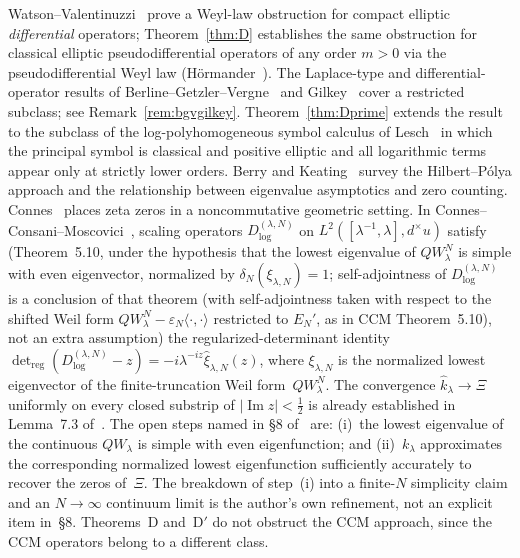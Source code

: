 \documentclass[12pt]{amsart}
\begin{document}
Watson--Valentinuzzi~\cite{Watson2026} prove a Weyl-law obstruction
for compact elliptic \emph{differential} operators; Theorem~\ref{thm:D}
establishes the same obstruction for classical elliptic
pseudodifferential operators of any order $m>0$ via the
pseudodifferential Weyl law (H\"ormander~\cite{Hormander1968}).
The Laplace-type and differential-operator results of
Berline--Getzler--Vergne~\cite{BGV2004} and Gilkey~\cite{Gilkey1995}
cover a restricted subclass; see Remark~\ref{rem:bgvgilkey}.
Theorem~\ref{thm:Dprime} extends the result to the subclass of the
log-polyhomogeneous symbol calculus of Lesch~\cite{Lesch1999} in
which the principal symbol is classical and positive elliptic and all
logarithmic terms appear only at strictly lower orders.
Berry and Keating~\cite{BerryKeating1999} survey the Hilbert--P\'olya
approach and the relationship between eigenvalue asymptotics and zero
counting.
Connes~\cite{Connes1999} places zeta zeros in a noncommutative
geometric setting.  In Connes--Consani--Moscovici~\cite{CCM2025},
scaling operators $D_{\log}^{(\lambda,N)}$ on $L^2([\lambda^{-1},\lambda],d^\times u)$
satisfy (Theorem~5.10, under the hypothesis that the lowest eigenvalue of
$QW_\lambda^N$ is simple with even eigenvector, normalized by
$\delta_N(\xi_{\lambda,N})=1$; self-adjointness of $D_{\log}^{(\lambda,N)}$
is a conclusion of that theorem (with self-adjointness taken with respect to
the shifted Weil form $QW_\lambda^N-\varepsilon_N\langle\cdot,\cdot\rangle$
restricted to $E_N'$, as in CCM Theorem~5.10), not an extra assumption)
the regularized-determinant identity
$\det_{\mathrm{reg}}(D_{\log}^{(\lambda,N)}-z)=-i\lambda^{-iz}\hat{\xi}_{\lambda,N}(z)$,
where $\xi_{\lambda,N}$ is the normalized lowest eigenvector of the
finite-truncation Weil form~$QW_\lambda^N$.
The convergence $\hat{k}_\lambda\to\Xi$ uniformly on every closed substrip of
$|\operatorname{Im}z|<\tfrac{1}{2}$
is already established in Lemma~7.3 of~\cite{CCM2025}.
The open steps named in \S8 of~\cite{CCM2025} are:
(i)~the lowest eigenvalue of the continuous $QW_\lambda$ is simple
with even eigenfunction; and
(ii)~$k_\lambda$ approximates the corresponding normalized lowest
eigenfunction sufficiently accurately to recover the zeros of~$\Xi$.
The breakdown of step~(i) into a finite-$N$ simplicity claim and an
$N\to\infty$ continuum limit is the author's own refinement, not an
explicit item in~\S8.
Theorems~D and~D$'$ do not obstruct the CCM approach, since the CCM
operators belong to a different class.

\end{document}
